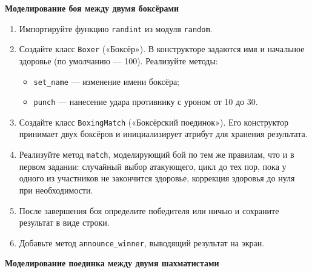 \item \textbf{Моделирование боя между двумя боксёрами}

\begin{enumerate}
    \item Импортируйте функцию \texttt{randint} из модуля \texttt{random}.

    \item Создайте класс \texttt{Boxer} («Боксёр»).  
    В конструкторе задаются имя и начальное здоровье (по умолчанию — 100).  
    Реализуйте методы:
    \begin{itemize}
        \item \texttt{set\_name} — изменение имени боксёра;
        \item \texttt{punch} — нанесение удара противнику с уроном от 10 до 30.
    \end{itemize}

    \item Создайте класс \texttt{BoxingMatch} («Боксёрский поединок»).  
    Его конструктор принимает двух боксёров и инициализирует атрибут для хранения результата.

    \item Реализуйте метод \texttt{match}, моделирующий бой по тем же правилам, что и в первом задании: случайный выбор атакующего, цикл до тех пор, пока у одного из участников не закончится здоровье, коррекция здоровья до нуля при необходимости.

    \item После завершения боя определите победителя или ничью и сохраните результат в виде строки.

    \item Добавьте метод \texttt{announce\_winner}, выводящий результат на экран.
\end{enumerate}

\item \textbf{Моделирование поединка между двумя шахматистами}


